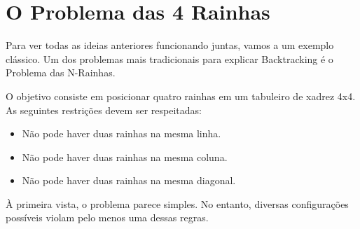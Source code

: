 \section{O Problema das 4 Rainhas}

Para ver todas as ideias anteriores funcionando juntas, vamos a um exemplo clássico. Um dos problemas mais tradicionais para explicar Backtracking é o Problema das N-Rainhas.

O objetivo consiste em posicionar quatro rainhas em um tabuleiro de xadrez 4x4. As seguintes restrições devem ser respeitadas:

\begin{itemize}[leftmargin=1.4em]
  \item Não pode haver duas rainhas na mesma linha.
  \item Não pode haver duas rainhas na mesma coluna.
  \item Não pode haver duas rainhas na mesma diagonal.
\end{itemize}

À primeira vista, o problema parece simples. No entanto, diversas configurações possíveis violam pelo menos uma dessas regras.
